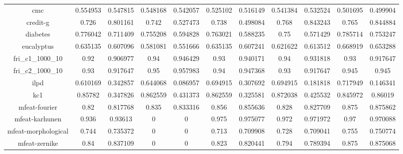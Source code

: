\documentclass[review]{elsarticle}
\begin{document}
\begin{table}[htbp]
{\begin{tabular}{ccccccccccc}
		cmc                              & 0.554953             & 0.547815            & 0.548168  & 0.542057 & 0.525102          & 0.516149         & 0.541384   & 0.532524  & 0.501695  & 0.499904  \\
		credit-g                         & 0.726                & 0.801161            & 0.742     & 0.527473 & 0.738             & 0.498084         & 0.768      & 0.843243  & 0.765     & 0.844884  \\
		diabetes                         & 0.776042             & 0.711409            & 0.755208  & 0.594828 & 0.763021          & 0.588235         & 0.75       & 0.571429  & 0.785714  & 0.753247  \\
		eucalyptus                       & 0.635135             & 0.607096            & 0.581081  & 0.551666 & 0.635135          & 0.607241         & 0.621622   & 0.613512  & 0.668919  & 0.653288  \\
		fri\_c1\_1000\_10                & 0.92                 & 0.906977            & 0.94      & 0.946429 & 0.93              & 0.940171         & 0.94       & 0.931818  & 0.93      & 0.917647  \\
		fri\_c2\_1000\_10                & 0.93                 & 0.917647            & 0.95      & 0.957983 & 0.94              & 0.947368         & 0.93       & 0.917647  & 0.945     & 0.945     \\
		ilpd                             & 0.610169             & 0.342857            & 0.644068  & 0.086957 & 0.694915          & 0.307692         & 0.694915   & 0.181818  & 0.717949  & 0.146341  \\
		kc1                              & 0.85782              & 0.347826            & 0.862559  & 0.431373 & 0.862559          & 0.325581         & 0.872038   & 0.425532  & 0.845972  & 0.86019   \\
		mfeat-fourier                    & 0.82                 & 0.817768            & 0.835     & 0.833316 & 0.856             & 0.855636         & 0.828      & 0.827709  & 0.875     & 0.875862  \\
		mfeat-karhunen                   & 0.936                & 0.93613             & 0         & 0        & 0.975             & 0.975077         & 0.972      & 0.971972  & 0.97      & 0.970088  \\
		mfeat-morphological              & 0.744                & 0.735372            & 0         & 0        & 0.713             & 0.709908         & 0.728      & 0.709041  & 0.755     & 0.750774  \\
		mfeat-zernike                    & 0.84                 & 0.837109            & 0         & 0        & 0.823             & 0.820441         & 0.794      & 0.789394  & 0.875     & 0.875068  \\

\end{tabular}}
\end{table}
\end{document}
